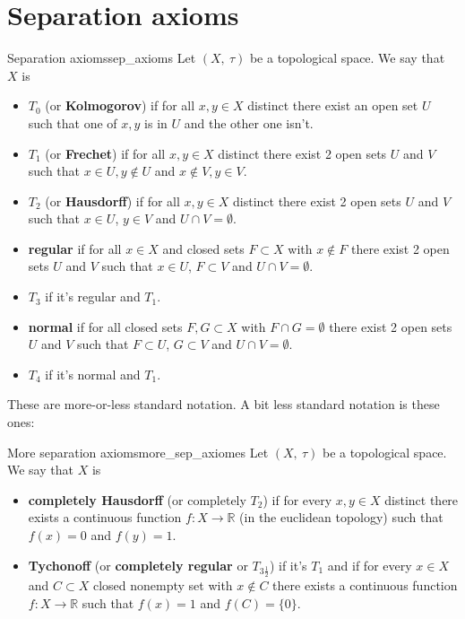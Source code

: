 \documentclass[a4paper]{book}
\theoremstyle{definition}
\theoremstyle{ejemplo}
\theoremstyle{demostracion}
\newcommand{\reales}{\mathbb{R}}
\begin{document}
\section{Separation axioms}
\begin{define}{Separation axioms}{sep_axioms}
	Let $(X,\ \tau)$ be a topological space. We say that $X$ is
	\begin{itemize}
		\item
		$T_0$ (or \textbf{Kolmogorov}) if for all $x,y \in X$ distinct there exist an open set $U$ such that one of $x,y$ is in $U$ and the other one isn't.
		
		\item
		$T_1$ (or \textbf{Frechet}) if for all $x,y \in X$ distinct there exist 2 open sets $U$ and $V$ such that $x \in U, y \not \in U$ and $x \not \in V, y \in V$.
		
		\item
		$T_2$ (or \textbf{Hausdorff}) if for all $x,y \in X$ distinct there exist 2 open sets $U$ and $V$ such that $x \in U$, $y \in V$ and $U \cap V = \emptyset$.
		
		\item
		\textbf{regular} if for all $x \in X$ and closed sets $F \subset X$ with $x \not \in F$ there exist 2 open sets $U$ and $V$ such that $x \in U$, $F \subset V$ and $U \cap V = \emptyset$.
		
		\item
		$T_3$ if it's regular and $T_1$.
		
		\item
		\textbf{normal} if for all closed sets $F,G \subset X$ with $F \cap G = \emptyset$ there exist 2 open sets $U$ and $V$ such that $F \subset U$, $G \subset V$ and $U \cap V = \emptyset$.
		
		\item
		$T_4$ if it's normal and $T_1$.
	\end{itemize}
\end{define}

These are more-or-less standard notation. A bit less standard notation is these ones:

\begin{define}{More separation axioms}{more_sep_axiomes}
	Let $(X,\ \tau)$ be a topological space. We say that $X$ is
	\begin{itemize}
		\item
		\textbf{completely Hausdorff} (or completely $T_2$) if for every $x,y\in X$ distinct there exists a continuous function $f: X \rightarrow \reales$ (in the euclidean topology) such that $f(x) = 0$ and $f(y) = 1$.
		
		\item
		\textbf{Tychonoff} (or \textbf{completely regular} or $T_{3\frac{1}{2}}$) if it's $T_1$ and if for every $x \in X$ and $C \subset X$ closed nonempty set with $x \not \in C$ there exists a continuous function $f: X \rightarrow \reales$ such that $f(x) = 1$ and $f(C) = \{ 0 \}$.
	\end{itemize}
\end{define}
\end{document}
